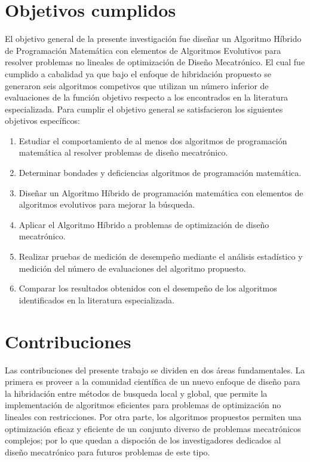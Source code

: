 	 \section{Objetivos cumplidos}
	  El objetivo general de la presente investigación fue diseñar un Algoritmo Híbrido de Programación Matemática con elementos de Algoritmos Evolutivos  para resolver problemas no lineales de optimización de  Diseño Mecatrónico. El cual fue cumplido a cabalidad ya que bajo el enfoque de hibridación propuesto se generaron seis algoritmos competivos que utilizan un número inferior de evaluaciones de la función objetivo respecto a los encontrados en la literatura especializada. Para cumplir el objetivo general se satisfacieron los siguientes objetivos específicos:
	 \begin{enumerate}
	 	\item	Estudiar el comportamiento de al menos dos algoritmos de programación matemática al resolver problemas de diseño mecatrónico.
	 	\item	Determinar bondades y deficiencias algoritmos de programación matemática.
	 	\item	Diseñar un Algoritmo Híbrido de programación matemática con elementos de algoritmos evolutivos para mejorar la búsqueda.
	 	\item	Aplicar el Algoritmo Híbrido a problemas de optimización de diseño mecatrónico.
	 	\item	Realizar pruebas de medición de desempeño mediante el análisis estadístico y medición del número de evaluaciones del algoritmo propuesto.
	 	\item	Comparar los resultados obtenidos con el desempeño de los algoritmos identificados en la literatura especializada.
	 \end{enumerate}
	 
 \section{Contribuciones}
 Las contribuciones del presente trabajo se dividen en dos áreas fundamentales. La primera es proveer a la comunidad científica de un nuevo enfoque de diseño para la hibridación entre métodos de busqueda local y global, que permite la implementación de algoritmos eficientes para problemas de optimización no lineales con restricciones. Por otra parte, los algoritmos propuestos permiten una optimización eficaz y eficiente de un conjunto diverso de problemas mecatrónicos complejos; por lo que quedan a dispoción de los investigadores dedicados al diseño mecatrónico para futuros problemas de este tipo. 
